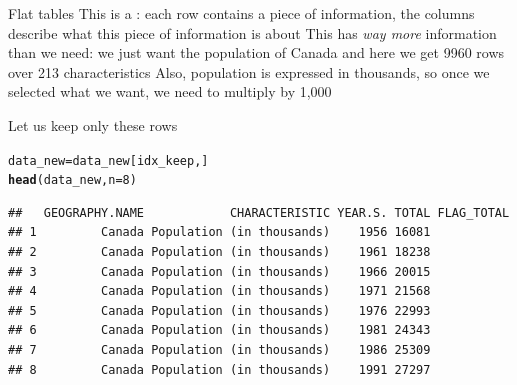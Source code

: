 \documentclass[aspectratio=169]{beamer}\usepackage[]{graphicx}\usepackage[]{xcolor}
\makeatletter
\newcommand{\hlnum}[1]{\textcolor[rgb]{0.686,0.059,0.569}{#1}}%
\newcommand{\hlsng}[1]{\textcolor[rgb]{0.192,0.494,0.8}{#1}}%
\newcommand{\hlopt}[1]{\textcolor[rgb]{0,0,0}{#1}}%
\newcommand{\hldef}[1]{\textcolor[rgb]{0.345,0.345,0.345}{#1}}%
\newcommand{\hlkwb}[1]{\textcolor[rgb]{0.69,0.353,0.396}{#1}}%
\newcommand{\hlkwc}[1]{\textcolor[rgb]{0.333,0.667,0.333}{#1}}%
\newcommand{\hlkwd}[1]{\textcolor[rgb]{0.737,0.353,0.396}{\textbf{#1}}}%
\newenvironment{kframe}{%
 \def\at@end@of@kframe{}%
 \ifinner\ifhmode%
  \def\at@end@of@kframe{\end{minipage}}%
  \begin{minipage}{\columnwidth}%
 \fi\fi%
 \def\FrameCommand##1{\hskip\@totalleftmargin \hskip-\fboxsep
 \colorbox{shadecolor}{##1}\hskip-\fboxsep
     \hskip-\linewidth \hskip-\@totalleftmargin \hskip\columnwidth}%
 \MakeFramed {\advance\hsize-\width
   \@totalleftmargin\z@ \linewidth\hsize
   \@setminipage}}%
 {\par\unskip\endMakeFramed%
 \at@end@of@kframe}
\newenvironment{knitrout}{}{} %
\makeatother
\begin{document}
\begin{frame}{Flat tables}
This is a : each row contains a piece of information, the columns describe what this piece of information is about
\vfill
This has \emph{way more} information than we need: we just want the population of Canada and here we get 9960 rows over 213 characteristics
\vfill
Also, population is expressed in thousands, so once we selected what we want, we need to multiply by 1,000
\end{frame}



\begin{frame}[fragile]
Let us keep only these rows
\begin{knitrout}
\color{fgcolor}\begin{kframe}
\begin{alltt}
\hldef{data_new} \hlkwb{=} \hldef{data_new[idx_keep,]}
\hlkwd{head}\hldef{(data_new,} \hlkwc{n} \hldef{=} \hlnum{8}\hldef{)}
\end{alltt}
\begin{verbatim}
##   GEOGRAPHY.NAME            CHARACTERISTIC YEAR.S. TOTAL FLAG_TOTAL
## 1         Canada Population (in thousands)    1956 16081           
## 2         Canada Population (in thousands)    1961 18238           
## 3         Canada Population (in thousands)    1966 20015           
## 4         Canada Population (in thousands)    1971 21568           
## 5         Canada Population (in thousands)    1976 22993           
## 6         Canada Population (in thousands)    1981 24343           
## 7         Canada Population (in thousands)    1986 25309           
## 8         Canada Population (in thousands)    1991 27297
\end{verbatim}
\end{kframe}
\end{knitrout}
\end{frame}
\end{document}
